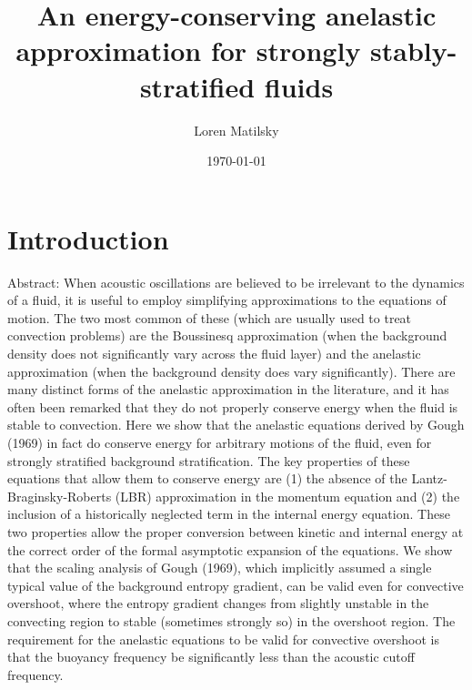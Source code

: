 \documentclass[12pt]{article}
\date{\today}
\author{Loren Matilsky}
\title{An energy-conserving anelastic approximation for strongly stably-stratified fluids}
\begin{document}
	\maketitle
	\section{Introduction}
	Abstract: When acoustic oscillations are believed to be irrelevant to the dynamics of a fluid, it is useful to employ simplifying approximations to the equations of motion. The two most common of these (which are usually used to treat convection problems) are the Boussinesq approximation (when the background density does not significantly vary across the fluid layer) and the anelastic approximation (when the background density does vary significantly). There are many distinct forms of the anelastic approximation in the literature, and it has often been remarked that they do not properly conserve energy when the fluid is stable to convection. Here we show that the anelastic equations derived by Gough (1969) in fact do conserve energy for arbitrary motions of the fluid, even for strongly stratified background stratification. The key properties of these equations that allow them to conserve energy are (1) the absence of the Lantz-Braginsky-Roberts (LBR) approximation in the momentum equation and (2) the inclusion of a historically neglected term in the internal energy equation. These two properties allow the proper conversion between kinetic and internal energy at the correct order of the formal asymptotic expansion of the equations. We show that the scaling analysis of Gough (1969), which implicitly assumed a single typical value of the background entropy gradient, can be valid even for convective overshoot, where the entropy gradient changes from slightly unstable in the convecting region to stable (sometimes strongly so) in the overshoot region. The requirement for the anelastic equations to be valid for convective overshoot is that the buoyancy frequency be significantly less than the acoustic cutoff frequency. 
	\\
	
\end{document}

